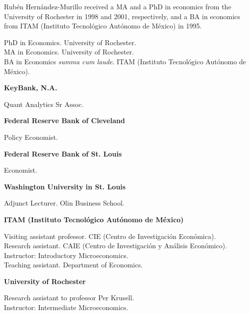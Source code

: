 \documentclass{xetexCV}
\begin{document}
\makecvtitle


Rub\'{e}n Hern\'{a}ndez-Murillo received a MA and a PhD in economics from the University of Rochester in 1998 and 2001, respectively, and a BA in economics from ITAM (Instituto Tecnol\'{o}gico Aut\'{o}nomo de M\'{e}xico) in 1995.

PhD in Economics. University of Rochester.  \\
MA in Economics. University of Rochester.  \\
BA in Economics \emph{summa cum laude}. ITAM (Instituto Tecnol\'{o}gico Aut\'{o}nomo de M\'{e}xico).  \\


\begin{flushleft}
\textbf{KeyBank, N.A.}
\end{flushleft} 
Quant Analytics Sr Assoc.   \\
\begin{flushleft}
\textbf{Federal Reserve Bank of Cleveland}
\end{flushleft} 
Policy Economist.   \\
\begin{flushleft}
\textbf{Federal Reserve Bank of St. Louis}
\end{flushleft} 
Economist.   \\
\begin{flushleft}
\textbf{Washington University in St. Louis}
\end{flushleft} 
Adjunct Lecturer. Olin Business School.  \\
\begin{flushleft}
\textbf{ITAM (Instituto Tecnol\'{o}gico Aut\'{o}nomo de M\'{e}xico)} 
\end{flushleft} 
Visiting assistant professor. CIE (Centro de Investigaci\'{o}n Econ\'{o}mica).   \\
Research assistant. CAIE (Centro de Investigaci\'{o}n y An\'{a}lisis Econ\'{o}mico).   \\
Instructor: Introductory Microeconomics.  \\
Teaching assistant. Department of Economics.  
\begin{flushleft} 
\textbf{University of Rochester} 
\end{flushleft} 
Research assistant to professor Per Krusell.  \\
Instructor: Intermediate Microeconomics.  
\end{document}
